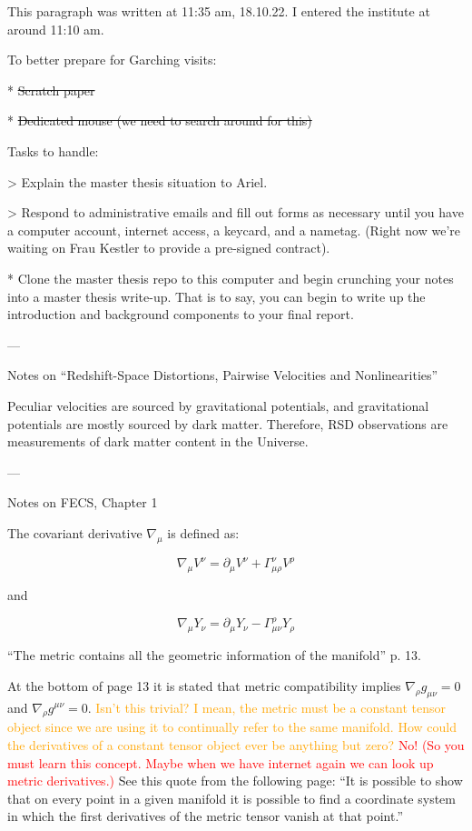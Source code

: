 \documentclass[11pt]{article}
\begin{document}
\fontsize{12}{15}

This paragraph was written at 11:35 am, 18.10.22. I entered the institute at around 11:10 am.

To better prepare for Garching visits:

* \sout{Scratch paper}

* \sout{Dedicated mouse (we need to search around for this)}

Tasks to handle:

> Explain the master thesis situation to Ariel.

> Respond to administrative emails and fill out forms as necessary until you have a computer account, internet access, a keycard, and a nametag. (Right now we're waiting on Frau Kestler to provide a pre-signed contract).

* Clone the master thesis repo to this computer and begin crunching your notes into a master thesis write-up. That is to say, you can begin to write up the introduction and background components to your final report.

---

Notes on ``Redshift-Space Distortions, Pairwise Velocities and Nonlinearities''

Peculiar velocities are sourced by gravitational potentials, and gravitational potentials are mostly sourced by dark matter. Therefore, RSD observations are measurements of dark matter content in the Universe.

---

Notes on FECS, Chapter 1

The covariant derivative $\nabla_\mu$ is defined as:

\begin{equation}
	\nabla_\mu V^\nu = \partial_\mu V^\nu + \Gamma^\nu_{\mu \rho} V^\rho
\end{equation}

and

\begin{equation}
	\nabla_\mu Y_\nu = \partial_\mu Y_\nu - \Gamma^\rho_{\mu \nu} Y_\rho
\end{equation}

``The metric contains all the geometric information of the manifold'' p. 13.

At the bottom of page 13 it is stated that metric compatibility implies $\nabla_\rho g_{\mu \nu} = 0$ and $\nabla_\rho  g^{\mu \nu} = 0$. \textcolor{orange}{Isn't this trivial? I mean, the metric must be a constant tensor object since we are using it to continually refer to the same manifold. How could the derivatives of a constant tensor object ever be anything but zero?} \textcolor{red}{No! (So you must learn this concept. Maybe when we have internet again we can look up metric derivatives.)} See this quote from the following page: ``It is possible to show that on every point in a given manifold it is possible to find a coordinate system in which the first derivatives of the metric tensor vanish at that point.''
\end{document}
